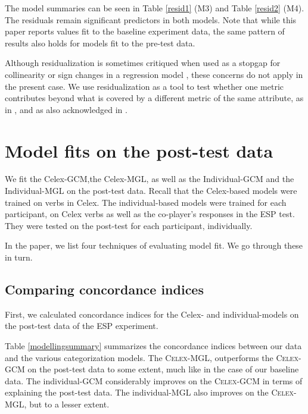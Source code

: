 \documentclass[12pt]{article}
\begin{document}
The model summaries can be seen in Table \ref{resid1} (M3) and Table \ref{resid2} (M4). The residuals remain significant predictors in both models. Note that while this paper reports values fit to the baseline experiment data, the same pattern of results also holds for models fit to the pre-test data.

Although residualization is sometimes critiqued when used as a stopgap for collinearity or sign changes in a regression model \citep{wurm2014residualizing}, these concerns do not apply in the present case.  We use residualization as a tool to test whether one metric contributes beyond what is covered by a different metric of the same attribute, as in 
\cite{baayen2006morphological}, and as also acknowledged in \cite{wurm2014residualizing}. 

\section{Model fits on the post-test data}\label{mglgcmposttest}

We fit the Celex-GCM,the Celex-MGL, as well as the Individual-GCM and the Individual-MGL on the post-test data. Recall that the Celex-based models were trained on verbs in Celex. The individual-based models were trained for each participant, on Celex verbs as well as the co-player's responses in the ESP test. They were tested on the post-test for each participant, individually.

In the paper, we list four techniques of evaluating model fit. We go through these in turn.

\subsection{Comparing concordance indices}

First, we calculated concordance indices for the Celex- and individual-models on the post-test data of the ESP experiment.


Table \ref{modellingsummary} summarizes the concordance indices between our data and the various categorization models. The \textsc{Celex}-MGL, outperforms the \textsc{Celex}-GCM on the post-test data to some extent, much like in the case of our baseline data. The individual-GCM considerably improves on the \textsc{Celex}-GCM in terms of explaining the post-test data. The individual-MGL also improves on the \textsc{Celex}-MGL, but to a lesser extent.
\end{document}
